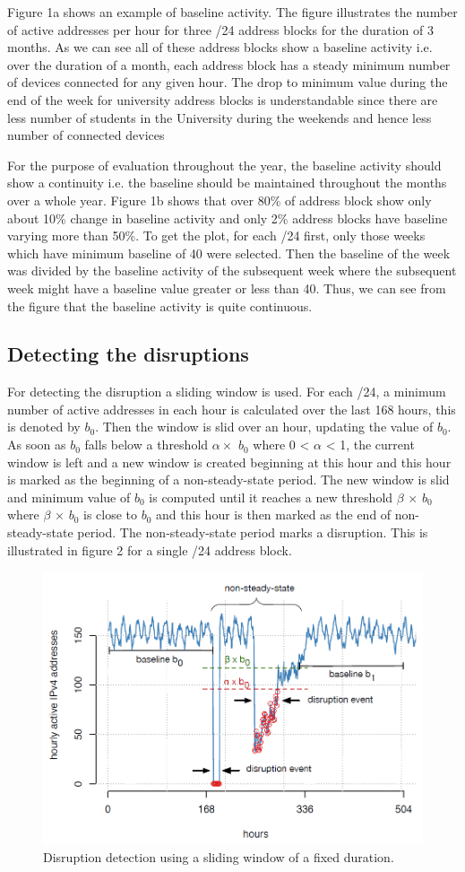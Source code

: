 \documentclass[11pt,twoside,a4paper]{article}
\begin{document}
Figure 1a shows an example of baseline activity. The figure illustrates the number of active addresses per hour for three /24 address blocks for the duration of 3 months. As we can see all of these address blocks show a baseline activity i.e. over the duration of a month, each address block has a steady minimum number of devices connected for any given hour. The drop to minimum value during the end of the week for university address blocks is understandable since there are less number of students in the University during the weekends and hence less number of connected devices

For the purpose of evaluation throughout the year, the baseline activity should show a continuity i.e. the baseline should be maintained throughout the months over a whole year. Figure 1b shows that over 80\% of address block show only about 10\% change in baseline activity and only 2\% address blocks have baseline varying more than 50\%. To get the plot, for each /24 first, only those weeks which have minimum baseline of 40 were selected. Then the baseline of the week was divided by the baseline activity of the subsequent week where the subsequent week might have a baseline value greater or less than 40. Thus, we can see from the figure that the baseline activity is quite continuous.

\subsection{Detecting the disruptions}
For detecting the disruption a sliding window is used. For each /24, a minimum number of active addresses in each hour is calculated over the last 168 hours, this is denoted by $b_0$. Then the window is slid over an hour, updating the value of $b_0$. As soon as $b_0$ falls below a threshold $\alpha \times$ $b_0$ where 0 < $ \alpha$ < 1, the current window is left and a new window is created beginning at this hour and this hour is marked as the beginning of a non-steady-state period. The new window is slid and minimum value of $b_0$ is computed until it reaches a new threshold $\beta$ $\times$ $b_0$ where $\beta$ $\times$ $b_0$ is close to $b_0$ and this hour is then marked as the end of non-steady-state period. The non-steady-state period marks a disruption. This is illustrated in figure 2 for a single /24 address block.

\begin{figure}[h!] 
\centering
  \includegraphics[width=0.6\linewidth]{Figures/2.png}
  \caption{Disruption detection using a sliding window of a fixed duration.}
  \label{fig:DisruptionDec}
\end{figure}
\end{document}
